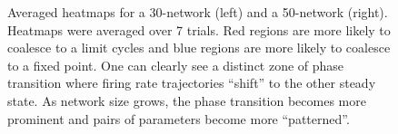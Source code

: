 \documentclass[psamsfonts]{amsart}
\theoremstyle{definition}
\theoremstyle{remark}
\numberwithin{equation}{section}
\begin{document}
\begin{figure}[h]
\begin{subfigure}{0.45\textwidth}
         \label{fig:1b}
     \end{subfigure}
     \caption{Averaged heatmaps for a 30-network (left) and a 50-network (right). Heatmaps were averaged over 7 trials. Red regions are more likely to coalesce to a limit cycles and blue regions are more likely to coalesce to a fixed point. One can clearly see a distinct zone of phase transition where firing rate trajectories ``shift'' to the other steady state. As network size grows, the phase transition becomes more prominent and pairs of parameters become more ``patterned''.}
     \label{fig:1}
\end{figure}




\end{document}
